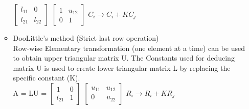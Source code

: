 \begin{itemize}
\begin{itemize}
            $\begin{bmatrix} l_{11} & 0\\ l_{21} & l_{22} \end{bmatrix}$
            $\begin{bmatrix} 1 & u_{12}\\ 0 & 1 \end{bmatrix}$
            \(C_i \rightarrow C_i + KC_j\)
            \item DooLittle's method (Strict last row operation)\\
            Row-wise Elementary transformation (one element at a time) can be used to obtain upper triangular matrix U. The Constants used for deducing matrix U is used to create lower triangular matrix L by replacing the specific constant (K).\\ A = LU = 
            $\begin{bmatrix} 1 & 0\\ l_{21} & 1 \end{bmatrix}$
            $\begin{bmatrix} u_{11} & u_{12}\\ 0 & u_{22} \end{bmatrix}$ 
            \(R_i \rightarrow R_i + KR_j\)
        \end{itemize}
\end{itemize}


